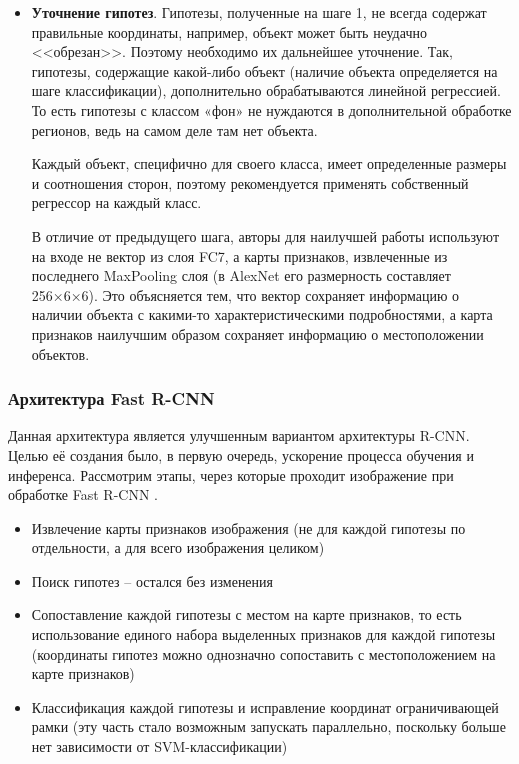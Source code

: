 \begin{itemize}
	\item \textbf{Уточнение гипотез}. 
	Гипотезы, полученные на шаге 1, не всегда содержат правильные координаты, например, объект может быть неудачно <<обрезан>>. Поэтому необходимо их дальнейшее уточнение. Так, гипотезы, содержащие какой-либо объект (наличие объекта определяется на шаге классификации), дополнительно обрабатываются линейной регрессией. То есть гипотезы с классом «фон» не нуждаются в дополнительной обработке регионов, ведь на самом деле там нет объекта.
	
	Каждый объект, специфично для своего класса, имеет определенные размеры и соотношения сторон, поэтому рекомендуется применять собственный регрессор на каждый класс.
	
	В отличие от предыдущего шага, авторы для наилучшей работы используют на входе не вектор из слоя FC7, а карты признаков, извлеченные из последнего MaxPooling слоя (в AlexNet его размерность составляет 256×6×6). Это объясняется тем, что  вектор сохраняет информацию о наличии объекта с какими-то характеристическими подробностями, а карта признаков наилучшим образом сохраняет информацию о местоположении объектов.
	
\end{itemize}

\subsubsection{Архитектура Fast R-CNN}

Данная архитектура является улучшенным вариантом архитектуры R-CNN. Целью её создания было, в первую очередь, ускорение процесса обучения и инференса. Рассмотрим этапы, через которые проходит изображение при обработке Fast R-CNN \cite{fasterrcnn}.

\begin{itemize}
	\item Извлечение карты признаков изображения (не для каждой гипотезы по отдельности, а для всего изображения целиком)
	\item Поиск гипотез -- остался без изменения
	\item Сопоставление каждой гипотезы с местом на карте признаков, то есть использование единого набора выделенных признаков для каждой гипотезы (координаты гипотез можно однозначно сопоставить с местоположением на карте признаков)
	\item Классификация каждой гипотезы и исправление координат ограничивающей рамки (эту часть стало возможным запускать параллельно, поскольку больше нет зависимости от SVM-классификации)
\end{itemize}

